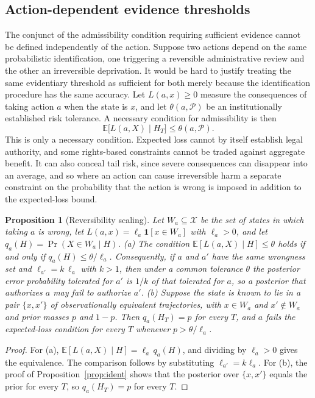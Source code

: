 \documentclass[11pt]{article}
\theoremstyle{plain}
\newtheorem{proposition}{Proposition}
\theoremstyle{definition}
\theoremstyle{remark}
\newcommand{\E}{\mathbb{E}}
\begin{document}
\subsection{Action-dependent evidence thresholds}

The conjunct of the admissibility condition requiring sufficient evidence cannot be defined independently of the action. Suppose two actions depend on the same probabilistic identification, one triggering a reversible administrative review and the other an irreversible deprivation. It would be hard to justify treating the same evidentiary threshold as sufficient for both merely because the identification procedure has the same accuracy. Let $L(a,x)\geq 0$ measure the consequences of taking action $a$ when the state is $x$, and let $\theta(a,\mathcal{P})$ be an institutionally established risk tolerance. A necessary condition for admissibility is then
\[
\E\bigl[L(a,X)\mid H_T\bigr]\leq\theta(a,\mathcal{P}).
\]
This is only a necessary condition. Expected loss cannot by itself establish legal authority, and some rights-based constraints cannot be traded against aggregate benefit. It can also conceal tail risk, since severe consequences can disappear into an average, and so where an action can cause irreversible harm a separate constraint on the probability that the action is wrong is imposed in addition to the expected-loss bound.

\begin{proposition}[Reversibility scaling]\label{prop:reversibility}
Let $W_a\subseteq\mathcal{X}$ be the set of states in which taking $a$ is wrong, let $L(a,x)=\ell_a\mathbf{1}[x\in W_a]$ with $\ell_a>0$, and let $q_a(H)=\Pr(X\in W_a\mid H)$. (a) The condition $\E[L(a,X)\mid H]\leq\theta$ holds if and only if $q_a(H)\leq\theta/\ell_a$. Consequently, if $a$ and $a'$ have the same wrongness set and $\ell_{a'}=k\,\ell_a$ with $k>1$, then under a common tolerance $\theta$ the posterior error probability tolerated for $a'$ is $1/k$ of that tolerated for $a$, so a posterior that authorizes $a$ may fail to authorize $a'$. (b) Suppose the state is known to lie in a pair $\{x,x'\}$ of observationally equivalent trajectories, with $x\in W_a$ and $x'\notin W_a$ and prior masses $p$ and $1-p$. Then $q_a(H_T)=p$ for every $T$, and $a$ fails the expected-loss condition for every $T$ whenever $p>\theta/\ell_a$.
\end{proposition}

\begin{proof}
For (a), $\E[L(a,X)\mid H]=\ell_a\,q_a(H)$, and dividing by $\ell_a>0$ gives the equivalence. The comparison follows by substituting $\ell_{a'}=k\ell_a$. For (b), the proof of Proposition~\ref{prop:ident} shows that the posterior over $\{x,x'\}$ equals the prior for every $T$, so $q_a(H_T)=p$ for every $T$.
\end{proof}
\end{document}
